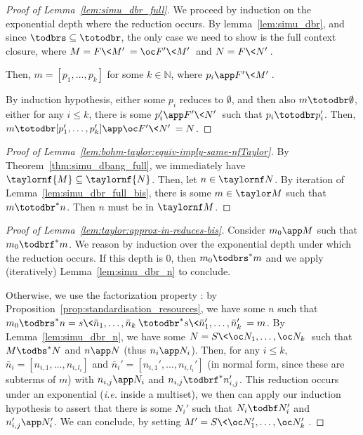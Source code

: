\begin{proof}[Proof of Lemma~\ref{lem:simu_dbr_full}]
	We proceed by induction on the exponential depth where the reduction
	occurs.	By lemma~\ref{lem:simu_dbr}, and since $\todbrs\subseteq\totodbr$, the
	only case we need to show is the full context closure, where $M=F\<M'\>=\oc
	F'\<M'\>$ and $N=F\<N'\>$. 

	Then, $m=[p_1,\dots ,p_k]$ for some $k\in\mathbb N$, where $p_i\app
	F'\<M'\>$.
	
	By induction hypothesis, either some $p_i$ reduces to $\emptyset$, and then also
	$m\totodbr \emptyset$, either for any $i\leq k$, there is some $p_i'\app
	F'\<N'\>$ such that $p_i\totodbr p_i'$. Then,
	$m\totodbr[p_1',\dots ,p_k']\app \oc F'\<N'\>=N$.
\end{proof}

\begin{proof}[Proof of Lemma~\ref{lem:bohm-taylor:equiv-imply-same-nfTaylor}]
	By Theorem~\ref{thm:simu_dbang_full}, we immediately have $\taylornf{M}\subseteq\taylornf{N}$.
	Then, let $n\in\taylornf N$. By iteration of Lemma~\ref{lem:simu_dbr_full_bis}, there
	is some $m\in\taylor M$ such that $m\totodbr^*n$. Then $n$ must
	be in $\taylornf M$. 
\end{proof}

\begin{proof}[Proof of Lemma~\ref{lem:taylor:approx-in-reduces-bis}]
	Consider $m_0\app M$ such that $m_0\todbrf^* m$. We reason by induction
	over the exponential depth under which the reduction occurs. If this
	depth is $0$, then $m_0\todbrs^*m$ and we apply (iteratively)
	Lemma~\ref{lem:simu_dbr_n} to conclude.

	Otherwise, we use the factorization property : by
	Proposition~\ref{prop:standardisation_resources}, we have some $n$ such
	that $m_0\todbrs^*n= s\<\bar n_1,\dots ,\bar n_k\>\totodbr^*s\<\bar n_1',\dots ,\bar n_k'\>=m$. By
	Lemma~\ref{lem:simu_dbr_n}, we have some $N=S\<\oc N_1,\dots ,\oc N_k\>$ such that $M\todbs^*N$ and
	$n\app N$ (thus $n_i\app N_i$). Then, for any $i\leq k$, $\bar
	n_i=[n_{i,1},\dots ,n_{i,l_i}]$ and $\bar n_i'=[n_{i,1}',\dots ,n_{i,l_i}']$ (in
	normal form, since these are subterms of $m$) with
	$n_{i,j}\app N_i$ and $n_{i,j}\todbrf^*n_{i,j}'$. This reduction occurs
	under an exponential (\emph{i.e.} inside a multiset), we then can apply
	our induction hypothesis to assert that there is some $N_i'$ such that
	$N_i\todbf N_i'$ and $n_{i,j}'\app N_i'$. We can conclude, by setting
	$M'=S\<\oc N_1',\dots ,\oc N_k'\>$.
\end{proof}

